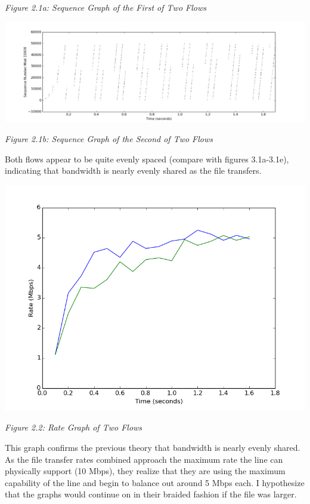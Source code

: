 \documentclass[11pt]{article}
\begin{document}
\centerline{\emph{Figure 2.1a: Sequence Graph of the First of Two Flows}}

\includegraphics[width=17cm]{outputs/twoflows/twoflows_sequence2000.png}

\centerline{\emph{Figure 2.1b: Sequence Graph of the Second of Two Flows}}

Both flows appear to be quite evenly spaced (compare with figures 3.1a-3.1e), indicating that bandwidth is nearly evenly shared as the file transfers.


\includegraphics[width=17cm]{outputs/twoflows/twoflows_rate.png}

\centerline{\emph{Figure 2.2: Rate Graph of Two Flows}}

This graph confirms the previous theory that bandwidth is nearly evenly shared. As the file transfer rates combined approach the maximum rate the line can physically support (10 Mbps), they realize that they are using the maximum capability of the line and begin to balance out around 5 Mbps each. I hypothesize that the graphs would continue on in their braided fashion if the file was larger.
\end{document}

